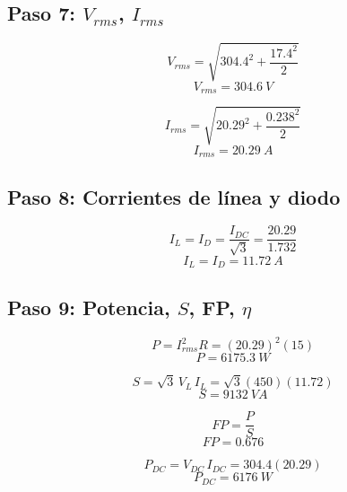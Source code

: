 \documentclass[12pt]{article}
\begin{document}
\subsection*{Paso 7: $V_{rms}$, $I_{rms}$}
\begin{equation}
V_{rms}=\sqrt{304.4^2+\frac{17.4^2}{2}}
\end{equation}
\begin{equation}
\boxed{V_{rms}=304.6\ V}
\end{equation}

\begin{equation}
I_{rms}=\sqrt{20.29^2+\frac{0.238^2}{2}}
\end{equation}
\begin{equation}
\boxed{I_{rms}=20.29\ A}
\end{equation}

\subsection*{Paso 8: Corrientes de línea y diodo}
\begin{equation}
I_L=I_D=\frac{I_{DC}}{\sqrt3}=\frac{20.29}{1.732}
\end{equation}
\begin{equation}
\boxed{I_L=I_D=11.72\ A}
\end{equation}

\subsection*{Paso 9: Potencia, $S$, FP, $\eta$}
\begin{equation}
P=I_{rms}^2R=(20.29)^2(15)
\end{equation}
\begin{equation}
\boxed{P=6175.3\ W}
\end{equation}

\begin{equation}
S=\sqrt3\,V_L\,I_L=\sqrt3(450)(11.72)
\end{equation}
\begin{equation}
\boxed{S=9132\ VA}
\end{equation}

\begin{equation}
FP=\frac{P}{S}
\end{equation}
\begin{equation}
\boxed{FP=0.676}
\end{equation}

\begin{equation}
P_{DC}=V_{DC}\,I_{DC}=304.4(20.29)
\end{equation}
\begin{equation}
\boxed{P_{DC}=6176\ W}
\end{equation}
\end{document}
